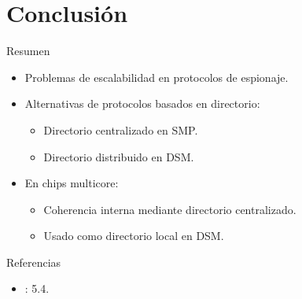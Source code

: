 \section{Conclusión}

\begin{frame}[t]{Resumen}
\begin{itemize}
  \item Problemas de escalabilidad en protocolos de espionaje.
  \item Alternativas de protocolos basados en directorio:
    \begin{itemize}
      \item Directorio centralizado en SMP.
      \item Directorio distribuido en DSM.
    \end{itemize}
  \item En chips multicore:
    \begin{itemize}
      \item Coherencia interna mediante directorio centralizado.
      \item Usado como directorio local en DSM.
    \end{itemize}
\end{itemize}
\end{frame}


\begin{frame}[t]{Referencias}
\begin{itemize}
  \item \bibhennessy
  : 5.4.

\end{itemize}
\end{frame}

